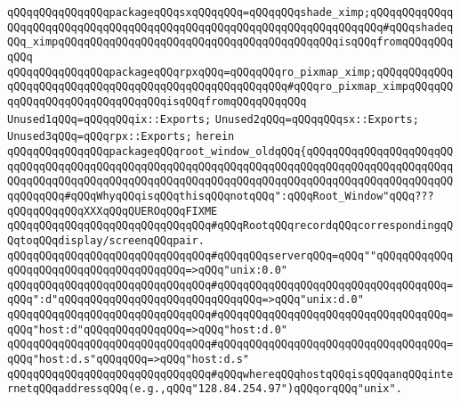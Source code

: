 \verb|qQQqqQQqqQQqqQQqpackageqQQqsxqQQqqQQq=qQQqqQQqshade_ximp;qQQqqQQqqQQqqQQqqQQqqQQqqQQqqQQqqQQqqQQqqQQqqQQqqQQqqQQqqQQqqQQqqQQqqQQq#qQQqshadeqQQq_ximpqQQqqQQqqQQqqQQqqQQqqQQqqQQqqQQqqQQqqQQqqQQqisqQQqfromqQQqqQQqqQQq|\newline
\verb|qQQqqQQqqQQqqQQqpackageqQQqrpxqQQq=qQQqqQQqro_pixmap_ximp;qQQqqQQqqQQqqQQqqQQqqQQqqQQqqQQqqQQqqQQqqQQqqQQqqQQqqQQq#qQQqro_pixmap_ximpqQQqqQQqqQQqqQQqqQQqqQQqqQQqqQQqisqQQqfromqQQqqQQqqQQq|\newline
\verb|Unused1qQQq=qQQqqQQqix::Exports;|\newline
\verb|Unused2qQQq=qQQqqQQqsx::Exports;|\newline
\verb|Unused3qQQq=qQQqrpx::Exports;|\newline
\newline
\verb|herein|\newline
\newline
\verb|qQQqqQQqqQQqqQQqpackageqQQqroot_window_oldqQQq{qQQqqQQqqQQqqQQqqQQqqQQqqQQqqQQqqQQqqQQqqQQqqQQqqQQqqQQqqQQqqQQqqQQqqQQqqQQqqQQqqQQqqQQqqQQqqQQqqQQqqQQqqQQqqQQqqQQqqQQqqQQqqQQqqQQqqQQqqQQqqQQqqQQqqQQqqQQqqQQqqQQqqQQqqQQq#qQQqWhyqQQqisqQQqthisqQQqnotqQQq":qQQqRoot_Window"qQQq???qQQqqQQqqQQqXXXqQQqQUEROqQQqFIXME|\newline
\newline
\newline
\verb|qQQqqQQqqQQqqQQqqQQqqQQqqQQqqQQq#qQQqRootqQQqrecordqQQqcorrespondingqQQqtoqQQqdisplay/screenqQQqpair.|\newline
\verb|qQQqqQQqqQQqqQQqqQQqqQQqqQQqqQQq#qQQqqQQqserverqQQq=qQQq""qQQqqQQqqQQqqQQqqQQqqQQqqQQqqQQqqQQqqQQq=>qQQq"unix:0.0"|\newline
\verb|qQQqqQQqqQQqqQQqqQQqqQQqqQQqqQQq#qQQqqQQqqQQqqQQqqQQqqQQqqQQqqQQqqQQq=qQQq":d"qQQqqQQqqQQqqQQqqQQqqQQqqQQqqQQq=>qQQq"unix:d.0"|\newline
\verb|qQQqqQQqqQQqqQQqqQQqqQQqqQQqqQQq#qQQqqQQqqQQqqQQqqQQqqQQqqQQqqQQqqQQq=qQQq"host:d"qQQqqQQqqQQqqQQq=>qQQq"host:d.0"|\newline
\verb|qQQqqQQqqQQqqQQqqQQqqQQqqQQqqQQq#qQQqqQQqqQQqqQQqqQQqqQQqqQQqqQQqqQQq=qQQq"host:d.s"qQQqqQQq=>qQQq"host:d.s"|\newline
\verb|qQQqqQQqqQQqqQQqqQQqqQQqqQQqqQQq#qQQqwhereqQQqhostqQQqisqQQqanqQQqinternetqQQqaddressqQQq(e.g.,qQQq"128.84.254.97")qQQqorqQQq"unix".|\newline
